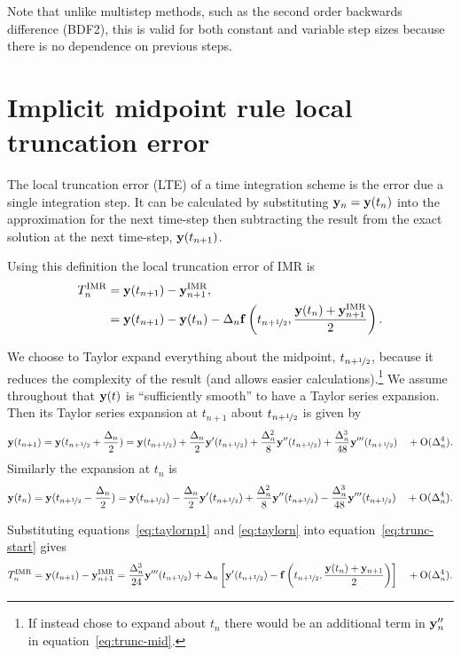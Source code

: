 Note that unlike multistep methods, such as the second order backwards difference (BDF2), this is valid for both constant and variable step sizes because there is no dependence on previous steps.


\section{Implicit midpoint rule local truncation error}
\label{sec:deriv-local-trunc}

The local truncation error (LTE) of a time integration scheme is the error due a single integration step.
It can be calculated by substituting $\mathbf{y}_n = \mathbf{y}(t_n)$ into the approximation for the next time-step then subtracting the result from the exact solution at the next time-step, $\mathbf{y}(t_{n+1})$.

Using this definition the local truncation error of IMR is
\begin{align}
  \lte^\IMP &= \yv(t_{n+1}) - \yv_{n+1}^\IMP, \notag\\
  &= \yv(t_{n+1}) - \yv(t_n) - \dtn \fv\left( \thf, \frac{\yv(t_n) + \yv_{n+1}^\IMP}{2} \right).
  \label{eq:trunc-start}
\end{align}

We choose to Taylor expand everything about the midpoint, $t_{n+\nicefrac{1}{2}}$, because it reduces the complexity of the result (and allows easier calculations).\footnote{If instead chose to expand about $t_n$ there would be an additional term in $\mathbf{y}_n''$ in equation~\eqref{eq:trunc-mid}.}
We assume throughout that $\mathbf{y}(t)$ is ``sufficiently smooth'' to have a Taylor series expansion. Then its Taylor series expansion at $t_{n+1}$ about $t_{n+\nicefrac{1}{2}}$ is given by
\begin{equation}
  \yv(t_{n+1}) = \yv(\thf + \frac{\dtn}{2}) = \yvhf + \frac{\dtn}{2} \yvhf['] + \frac{\dtn^2}{8} \yvhf[''] + \frac{\dtn^3}{48} \yvhf['''] \porder{\dtn^4}.
  \label{eq:taylornp1}
\end{equation}
Similarly the expansion at $t_n$ is
\begin{equation}
  \yv(t_n) = \yv(\thf - \frac{\dtn}{2}) = \yvhf - \frac{\dtn}{2} \yvhf['] + \frac{\dtn^2}{8} \yvhf[''] - \frac{\dtn^3}{48} \yvhf['''] \porder{\dtn^4}.
  \label{eq:taylorn}
\end{equation}

Substituting equations~\eqref{eq:taylornp1} and \eqref{eq:taylorn} into equation~\eqref{eq:trunc-start} gives
\begin{equation}
  \lte^\IMP = \yv(t_{n+1}) - \yv_{n+1}^\IMP
  = \frac{\dtn^3}{24} \yvhf[''']  + \dtn  \left[ \yvhf[']
  - \fv\left( \thf, \frac{\yv(t_n) + \yv_{n+1}}{2} \right) \right]  \porder{\dtn^4}.
  \label{eq:trunc-mid}
\end{equation}

